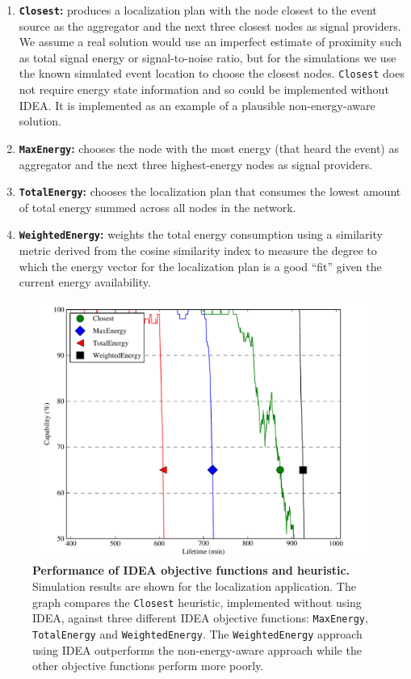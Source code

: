 \begin{enumerate}

\item \textbf{\texttt{Closest}:} produces a localization plan with the node
closest to the event source as the aggregator and the next three closest
nodes as signal providers. We assume a real solution would use an imperfect
estimate of proximity such as total signal energy or signal-to-noise ratio,
but for the simulations we use the known simulated event location to choose
the closest nodes. \texttt{Closest} does not require energy state information
and so could be implemented without IDEA. It is implemented as an example of
a plausible non-energy-aware solution.

\item \textbf{\texttt{MaxEnergy}:} chooses the node with the most energy
(that heard the event) as aggregator and the next three highest-energy nodes
as signal providers.

\item \textbf{\texttt{TotalEnergy}:} chooses the localization plan that
consumes the lowest amount of total energy summed across all nodes in the
network.

\item \textbf{\texttt{WeightedEnergy}:} weights the total energy consumption
using a similarity metric derived from the cosine similarity index to measure
the degree to which the energy vector for the localization plan is a good
``fit'' given the current energy availability.

\end{enumerate}

\begin{figure}[t]
\begin{center}
\includegraphics[width=0.7\hsize]{./5-idea/figs/ideavheuristics.pdf}
\end{center}

\caption{\textbf{Performance of IDEA objective functions and heuristic.}
Simulation results are shown for the localization application. The graph
compares the \texttt{Closest} heuristic, implemented without using IDEA,
against three different IDEA objective functions: \texttt{MaxEnergy},
\texttt{TotalEnergy} and \texttt{WeightedEnergy}. The \texttt{WeightedEnergy}
approach using IDEA outperforms the non-energy-aware approach while the other
objective functions perform more poorly.}

\label{idea-fig-ideavheuristics}
\end{figure}

